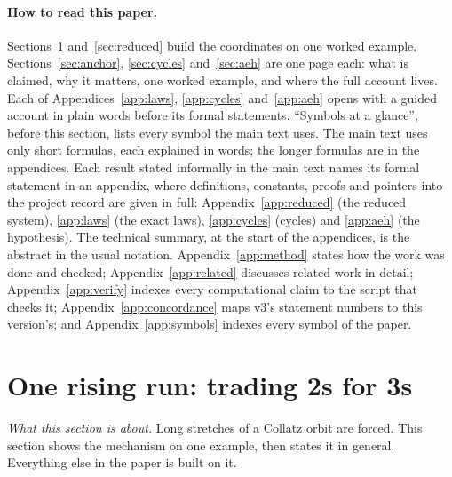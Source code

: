 \documentclass[11pt]{article}
\theoremstyle{remark}
\begin{document}
\paragraph{How to read this paper.} Sections~\ref{sec:block} and~\ref{sec:reduced} build the coordinates on one worked example. Sections~\ref{sec:anchor}, \ref{sec:cycles} and~\ref{sec:aeh} are one page each: what is claimed, why it matters, one worked example, and where the full account lives. Each of Appendices~\ref{app:laws}, \ref{app:cycles} and~\ref{app:aeh} opens with a guided account in plain words before its formal statements. ``Symbols at a glance'', before this section, lists every symbol the main text uses. The main text uses only short formulas, each explained in words; the longer formulas are in the appendices. Each result stated informally in the main text names its formal statement in an appendix, where definitions, constants, proofs and pointers into the project record are given in full: Appendix~\ref{app:reduced} (the reduced system), \ref{app:laws} (the exact laws), \ref{app:cycles} (cycles) and \ref{app:aeh} (the hypothesis). The technical summary, at the start of the appendices, is the abstract in the usual notation. Appendix~\ref{app:method} states how the work was done and checked; Appendix~\ref{app:related} discusses related work in detail; Appendix~\ref{app:verify} indexes every computational claim to the script that checks it; Appendix~\ref{app:concordance} maps v3's statement numbers to this version's; and Appendix~\ref{app:symbols} indexes every symbol of the paper.

\section{One rising run: trading 2s for 3s}\label{sec:block}

\emph{What this section is about.} Long stretches of a Collatz orbit are forced. This section shows the mechanism on one example, then states it in general. Everything else in the paper is built on it.
\end{document}
